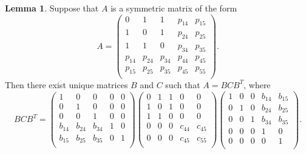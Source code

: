 \documentclass{amsart}
\theoremstyle{definition}
\newtheorem{lemma}[theorem]{Lemma}
\theoremstyle{remark}
\begin{document}
\begin{lemma}\label{lem:factors}
Suppose that $A$ is a symmetric matrix of the form
\[
A=\begin{pmatrix}
0 & 1 & 1 & p_{14} & p_{15} \\
1 & 0 & 1 & p_{24} & p_{25} \\
1 & 1 & 0 & p_{34} & p_{35} \\
p_{14} & p_{24} & p_{34} & p_{44} & p_{45} \\
p_{15} & p_{25} & p_{35} & p_{45} & p_{55} \\
\end{pmatrix}.
\]
Then there exist unique matrices $B$ and $C$ such that $A=BCB^{T}$, where 
\[
BCB^{T}=\begin{pmatrix}
1 & 0 & 0 & 0 & 0 \\
0 & 1 & 0 & 0 & 0 \\
0 & 0 & 1 & 0 & 0 \\
b_{14} & b_{24} & b_{34} & 1 & 0 \\
b_{15} & b_{25} & b_{35} & 0 & 1 \\
\end{pmatrix}
\begin{pmatrix}
0 & 1 & 1 & 0 & 0 \\
1 & 0 & 1 & 0 & 0 \\
1 & 1 & 0 & 0 & 0\\
0 & 0 & 0 & c_{44} & c_{45} \\
0 & 0 & 0 & c_{45} & c_{55} \\
\end{pmatrix}
\begin{pmatrix}
1 & 0 & 0 & b_{14} & b_{15} \\
0 & 1 & 0 & b_{24} & b_{25} \\
0 & 0 & 1 & b_{34} & b_{35} \\
0 & 0 & 0 & 1 & 0 \\
0 & 0 & 0 & 0 & 1 \\
\end{pmatrix}.
\]
\end{lemma}
\end{document}
